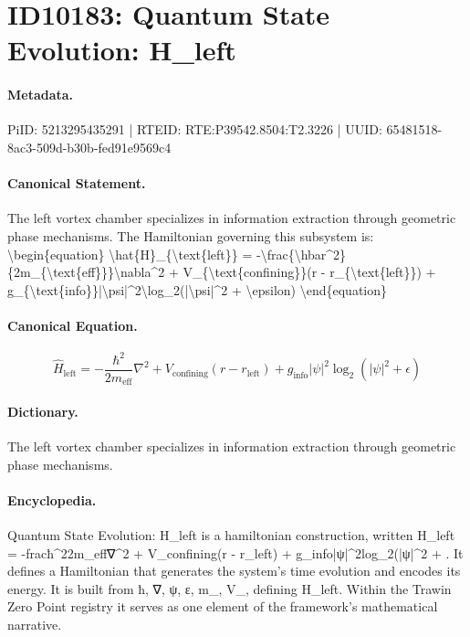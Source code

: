 \section*{ID10183: Quantum State Evolution: H\_left}
\paragraph{Metadata.}
PiID: 5213295435291 | RTEID: RTE:P39542.8504:T2.3226 | UUID: 65481518-8ac3-509d-b30b-fed91e9569c4

\paragraph{Canonical Statement.}
The left vortex chamber specializes in information extraction through geometric phase mechanisms. The Hamiltonian governing this subsystem is: \textbackslash{}begin\{equation\} \textbackslash{}hat\{H\}\_\{\textbackslash{}text\{left\}\} = -\textbackslash{}frac\{\textbackslash{}hbar\textasciicircum{}2\}\{2m\_\{\textbackslash{}text\{eff\}\}\}\textbackslash{}nabla\textasciicircum{}2 + V\_\{\textbackslash{}text\{confining\}\}(r - r\_\{\textbackslash{}text\{left\}\}) + g\_\{\textbackslash{}text\{info\}\}|\textbackslash{}psi|\textasciicircum{}2\textbackslash{}log\_2(|\textbackslash{}psi|\textasciicircum{}2 + \textbackslash{}epsilon) \textbackslash{}end\{equation\}

\paragraph{Canonical Equation.}
\[
\hat{H}_{\text{left}} = -\frac{\hbar^2}{2m_{\text{eff}}}\nabla^2 + V_{\text{confining}}(r - r_{\text{left}}) + g_{\text{info}}|\psi|^2\log_2(|\psi|^2 + \epsilon)
\]

\paragraph{Dictionary.}
The left vortex chamber specializes in information extraction through geometric phase mechanisms.

\paragraph{Encyclopedia.}
Quantum State Evolution: H\_left is a hamiltonian construction, written H\_left = -fracħ\textasciicircum{}22m\_eff∇\textasciicircum{}2 + V\_confining(r - r\_left) + g\_info|ψ|\textasciicircum{}2log\_2(|ψ|\textasciicircum{}2 + . It defines a Hamiltonian that generates the system's time evolution and encodes its energy. It is built from ħ, ∇, ψ, ε, m\_, V\_, defining H\_left. Within the Trawin Zero Point registry it serves as one element of the framework's mathematical narrative.
